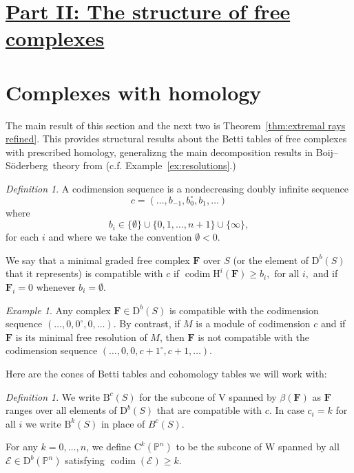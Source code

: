 \documentclass[12pt]{amsart}
\theoremstyle{definition}
\theoremstyle{remark}
\newtheorem{defn}[lemma]{Definition}
\newtheorem{example}[lemma]{Example}
\newcommand{\codim}{\operatorname{codim}}
\newcommand{\PP}{\mathbb{P}}
\newcommand{\HH}{\mathrm{H}}
\newcommand{\VV}{\mathrm{V}}
\newcommand{\WW}{\mathrm{W}}
\newcommand{\bb}{c}
\newcommand{\cE}{\mathcal{E}}
\newcommand{\FF}{\mathbf{F}}
\newcommand{\defi}[1]{\textsf{#1}} %
\newcommand{\zp}{\circ}
\newcommand{\nothing}{\emptyset}
\newcommand{\DD}{\mathrm{D}}
\newcommand{\CQ}{\mathrm{C}}
\newcommand{\BBQ}{\mathrm{B}}
\def\BS{Boij--S\"oderberg~}
\begin{document}
\section*{\underline{{Part II: The structure of free complexes}}}
\section{Complexes with homology}\label{sec:refined}
The main result of this section and the next two is Theorem~\ref{thm:extremal rays refined}.  This provides structural results about the Betti tables of free complexes with prescribed homology, generalizng the main decomposition results in \BS theory from \cites{eis-schrey1,boij-sod2} (c.f. Example~\ref{ex:resolutions}.)  

\begin{defn} A \defi{codimension sequence} is a nondecreasing
doubly infinite sequence
$$
\bb=(\dots, b_{-1}, b_{0}^{\circ}, b_{1}, \dots )
$$
where  
$$
b_{i}\in \{\nothing\} \cup \{0,1,\dots,n+1\}\cup \{\infty\},
$$
for each $i$ and where we take the convention $\nothing<0$.  

We say that a
minimal graded free complex $\FF$ over $S$ (or the element of $\DD^{b}(S)$ that it represents) is \defi{compatible with $\bb$} if 
$
\codim \HH^i(\FF) \geq b_i, \text{ for all } i,
$
and if $\FF_i=0$ whenever $b_i=\nothing$.
%
\end{defn}

\begin{example}
Any complex $\FF\in \DD^b(S)$ is compatible with the codimension sequence $(\dots, 0,0^\zp,0,\dots)$.  By contrast, if $M$ is a module of codimension $c$ and if $\FF$ is its minimal free resolution of $M$, then $\FF$ is not compatible with the codimension sequence $(\dots, 0,0,c+1^\zp,c+1,\dots)$.
\end{example}

Here are the cones of Betti tables and cohomology tables we will work with:
\begin{defn}\label{defn:cones}
We write $\BBQ^{\bb}(S)$ for the subcone of $\VV$ spanned by $\beta(\FF)$ as $\FF$ ranges over all elements of $\DD^b(S)$ that are compatible with $\bb$.  In case  $\bb_i=k$ for all $i$ we write $\BBQ^k(S)$ in place of $B^{\bb}(S)$.

For any $k=0, \dots, n$, we define $\CQ^k(\PP^n)$ to be the subcone of $\WW$ spanned by all $\cE\in \DD^b(\PP^n)$ satisfying $\codim(\cE)\geq k$.
\end{defn}
\end{document}
